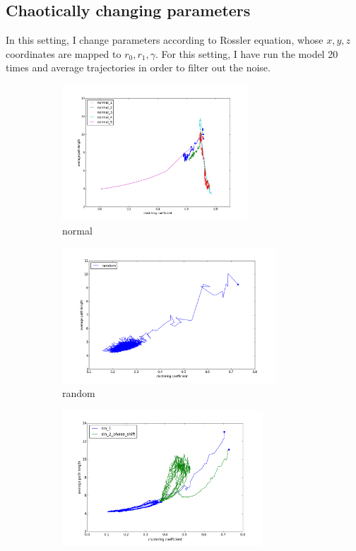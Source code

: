 \documentclass{article}
\begin{document}
\subsection{Chaotically changing parameters}
In this setting, I change parameters according to R$\ddot{\text{o}}$ssler equation, whose $x,y,z$ coordinates are mapped to $r_{0},r_{1},\gamma$.
For this setting, I have run the model 20 times and average trajectories in order to filter out the noise. 

\begin{figure}[h]
\centering
\begin{subfigure}{.5\textwidth}
  \centering
  \includegraphics[height=2in]{figs/normal.png}
  \caption{normal}
  \label{q1_1}
\end{subfigure}%
\hfill
\begin{subfigure}{.5\textwidth}
  \centering
  \includegraphics[height=2in]{figs/random.png}
  \caption{random}
  \label{q1_2}
\end{subfigure}%
\hfill
\begin{subfigure}{.5\textwidth}
  \centering
  \includegraphics[height=2in]{figs/sin.png}

\end{subfigure}
\end{figure}
\end{document}
